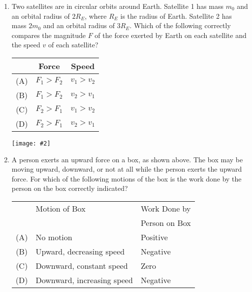 \documentclass[11pt]{article}
\newcommand{\pic}[2]{\texttt{[image: \#2]}}
\begin{document}
\begin{multicols}{2}
\begin{enumerate}[leftmargin=18pt,resume]
  \item Two satellites are in circular orbits around Earth. Satellite 1 has
    mass $m_0$ and an orbital radius of $2R_E$, where $R_E$ is the radius of
    Earth. Satellite 2 has mass $2m_0$ and an orbital radius of $3R_E$. Which
    of the following correctly compares the magnitude $F$ of the force exerted
    by Earth on each satellite and the speed $v$ of each satellite?

    \begin{tabular}{ccc}
      & Force & Speed\\
      \hline
      (A)  & $F_1 > F_2$ & $v_1 > v_2$ \\
      (B)  & $F_1 > F_2$ & $v_2 > v_1$ \\
      (C)  & $F_2 > F_1$ & $v_1 > v_2$ \\
      (D)  & $F_2 > F_1$ & $v_2 > v_1$
    \end{tabular}    
    \columnbreak
    
    \begin{center}
      \pic{.1}{push}
    \end{center}
  \item A person exerts an upward force on a box, as shown above. The box may be
    moving upward, downward, or not at all while the person exerts the upward
    force. For which of the following motions of the box is the work done by the
    person on the box correctly indicated?

    \begin{tabular}{cll}
      & Motion of Box & Work Done by\\
      &               & Person on Box \\
      \hline
      (A) & No motion                      & Positive \\
      (B) & Upward, decreasing speed   & Negative \\
      (C) & Downward, constant speed   & Zero     \\
      (D) & Downward, increasing speed & Negative
    \end{tabular}
    \vspace{.7in}
    

\end{enumerate}
\end{multicols}
\end{document}
